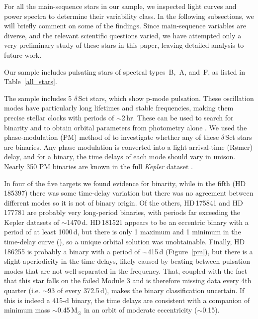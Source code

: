 \documentclass[a4paper,fleqn,usenatbib]{mnras}
\begin{document}
For all the main-sequence stars in our sample, we inspected light curves and power spectra to determine their variability class. In the following subsections, we will briefly comment on some of the findings. Since main-sequence variables are diverse, and the relevant scientific questions varied, we have attempted only a very preliminary study of these stars in this paper, leaving detailed analysis to future work.

Our sample includes pulsating stars of spectral types~B,~A, and~F, as listed in Table~\ref{all_stars}. 

The sample includes 5 $\delta$\,Sct stars, which show p-mode pulsation. These oscillation modes have particularly long lifetimes and stable frequencies, making them precise stellar clocks with periods of $\sim$2\,hr. These can be used to search for binarity and to obtain orbital parameters from photometry alone \citep{shibahashi&kurtz2012}. We used the phase-modulation (PM) method of \citet{murphyetal2014} to investigate whether any of these $\delta$\,Sct stars are binaries. Any phase modulation is converted into a light arrival-time (R\o mer) delay, and for a binary, the time delays of each mode should vary in unison. Nearly 350 PM binaries are known in the full \textit{Kepler} dataset \citep{murphyetal2018}.

In four of the five targets we found evidence for binarity, while in the fifth (HD\,185397) there was some time-delay variation but there was no agreement between different modes so it is not of binary origin. Of the others, HD\,175841 and HD\,177781 are probably very long-period binaries, with periods far exceeding the Kepler datasets of $\sim$1470\,d. HD\,181521 appears to be an eccentric binary with a period of at least 1000\,d, but there is only 1 maximum and 1 minimum in the time-delay curve (\citep[cf.][]{murphy&shibahashi2015}), so a unique orbital solution was unobtainable. Finally, HD\,186255 is probably a binary with a period of $\sim$415\,d (Figure~\ref{pm}), but there is a slight aperiodicity in the time delays, likely caused by beating between pulsation modes that are not well-separated in the frequency. That, coupled with the fact that this star falls on the failed Module 3 and is therefore missing data every 4th quarter (i.e. $\sim$93 of every 372.5\,d), makes the binary classification uncertain. If this is indeed a 415-d binary, the time delays are consistent with a companion of minimum mass $\sim$0.45\,M$_{\odot}$ in an orbit of moderate eccentricity ($\sim$0.15).
\end{document}
